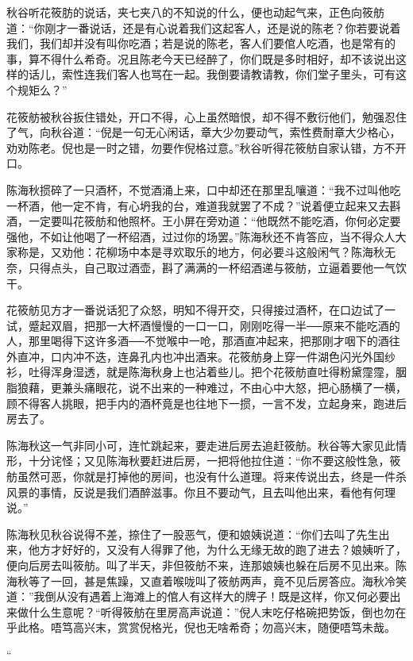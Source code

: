 \documentclass[12pt,UTF8]{ctexbook}
\begin{document}
{{{秋谷听花筱肪的说话，夹七夹八的不知说的什么，便也动起气来，正色向筱舫道：“你刚才一番说话，还是有心说着我们这起客人，还是说的陈老？你若要说着我们，我们却并没有叫你吃酒；若是说的陈老，客人们要倌人吃酒，也是常有的事，算不得什么希奇。况且陈老今天已经醉了，你们既是多时相好，却不该说出这样的话儿，索性连我们客人也骂在一起。我倒要请教请教，你们堂子里头，可有这个规矩么？”

花筱舫被秋谷扳住错处，开口不得，心上虽然暗恨，却不得不敷衍他们，勉强忍住了气，向秋谷道：“倪是一句无心闲话，章大少勿要动气，索性费耐章大少格心，劝劝陈老。倪也是一时之错，勿要作倪格过意。”秋谷听得花筱舫自家认错，方不开口。

陈海秋掼碎了一只酒杯，不觉酒涌上来，口中却还在那里乱嚷道：“我不过叫他吃一杯酒，他一定不肯，有心坍我的台，难道我就罢了不成？”说着便立起来又去斟酒，一定要叫花筱舫和他照杯。王小屏在旁劝道：“他既然不能吃酒，你何必定要强他，不如让他喝了一杯绍酒，过过你的场罢。”陈海秋还不肯答应，当不得众人大家称是，又劝他：花柳场中本是寻欢取乐的地方，何必要斗这般闲气？陈海秋无奈，只得点头，自己取过酒壶，斟了满满的一杯绍酒递与筱舫，立逼着要他一气饮干。

花筱舫见方才一番说话犯了众怒，明知不得开交，只得接过酒杯，在口边试了一试，蹙起双眉，把那一大杯酒慢慢的一口一口，刚刚吃得一半──原来不能吃酒的人，那里喝得下这许多酒──不觉喉中一呛，那酒直冲起来，把那刚才咽下的酒往外直冲，口内冲不迭，连鼻孔内也冲出酒来。花筱舫身上穿一件湖色闪光外国纱衫，吐得浑身湿透，就是陈海秋身上也沾着些儿。把个花筱舫直吐得粉黛霪霪，胭脂狼藉，更兼头痛眼花，说不出来的一种难过，不由心中大怒，把心肠横了一横，顾不得客人挑眼，把手内的酒杯竟是也往地下一掼，一言不发，立起身来，跑进后房去了。

陈海秋这一气非同小可，连忙跳起来，要走进后房去追赶筱舫。秋谷等大家见此情形，十分诧怪；又见陈海秋要赶进后房，一把将他拉住道：“你不要这般性急，筱舫虽然可恶，你就是打掉他的房间，也没有什么道理。将来传说出去，终是一件杀风景的事情，反说是我们酒醉滋事。你且不要动气，且去叫他出来，看他有何理说。”

陈海秋见秋谷说得不差，捺住了一股恶气，便和娘姨说道：“你们去叫了先生出来，他方才好好的，又没有人得罪了他，为什么无缘无故的跑了进去？娘姨听了，便向后房去叫筱舫。叫了半天，非但筱舫不来，连那娘姨也躲在后房不见出来。陈海秋等了一回，甚是焦躁，又直着喉咙叫了筱舫两声，竟不见后房答应。海秋冷笑道：”我倒从没有遇着上海滩上的倌人有这样大的牌子！既是这样，你又何必要出来做什么生意呢？“听得筱舫在里房高声说道：”倪人末吃仔格碗把势饭，倒也勿在乎此格。唔笃高兴末，赏赏倪格光，倪也无啥希奇；勿高兴末，随便唔笃未哉。

“

}}}
\end{document}
